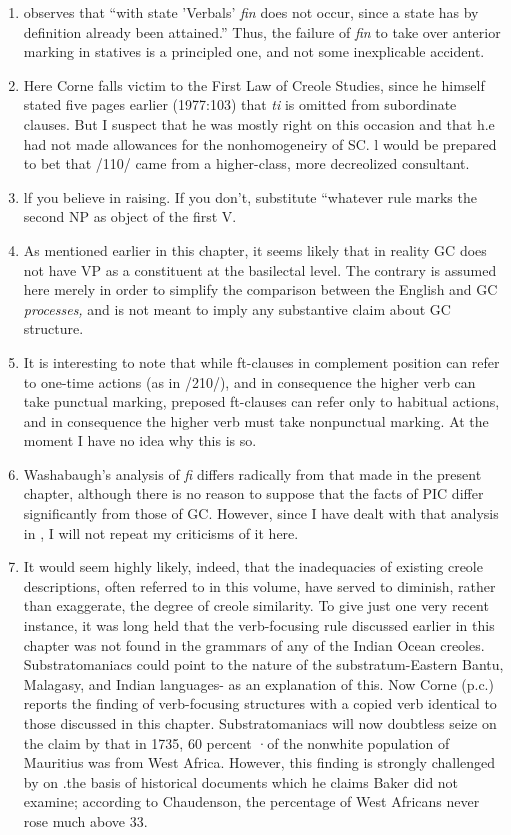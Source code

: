 \begin{enumerate}
\item \citet{Corne1981} observes that ``with state 'Verbals' \textit{fin} does not occur, since a state has by definition already been attained.'' Thus, the failure of \textit{fin} to take over anterior marking in statives is a principled one, and not some inexplicable accident.
\item Here Corne falls victim to the First Law of Creole Studies, since he himself stated five pages earlier (1977:103) that \textit{ti} is omitted from subordinate clauses. But I suspect that he was mostly right on this occasion and that h.e had not made allowances for the nonhomogeneiry of SC. l would be prepared to bet that /110/ came from a higher-class, more decreolized consultant.
\item lf you believe in raising. If you don't, substitute ``whatever rule marks the second NP as object of the first V.{\textquotedbl}
\item As mentioned earlier in this chapter, it seems likely that in reality GC does not have VP as a constituent at the basilectal level. The contrary is assumed here merely in order to simplify the com\-parison between the English and GC \textit{processes,} and is not meant to imply any substantive claim about GC structure.
\item It is interesting to note that while ft-clauses in complement position can refer to one-time actions (as in /210/), and in consequence the higher verb can take punctual marking, preposed ft-clauses can refer only to habitual actions, and in consequence the higher verb must take nonpunctual marking. At the moment I have no idea why this is so.
\item Washabaugh's analysis of \textit{fi} differs radically from that made in the present chapter, although there is no reason to suppose that the facts of PIC differ significantly from those of GC. However, since I
have dealt with that analysis in \citet{Bickerton1980}, I will not repeat my criticisms of it here.
\item It would seem highly likely, indeed, that the inadequacies
of existing creole descriptions, often referred to in this volume, have served to diminish, rather than exaggerate, the degree of creole simi\-larity. To give just one very recent instance, it was long held that the verb-focusing rule discussed earlier in this chapter was not found in the grammars of any of the Indian Ocean creoles. Substratomaniacs could point to the nature of the substratum-Eastern Bantu, Malagasy, and Indian languages- as an explanation of this. Now Corne (p.c.) reports the finding of verb-focusing structures with a copied verb identical to those discussed in this chapter. Substratomaniacs will now doubtless seize on the claim by \citet{Baker1976} that in 1735, 60 percent ·of the nonwhite population of Mauritius was from West Africa. However, this finding is strongly challenged by \citet{Chaudenson1979} on .the basis of historical documents which he claims Baker did not examine; according to Chaudenson, the percentage of West Africans never rose much above 33.


\end{enumerate}
